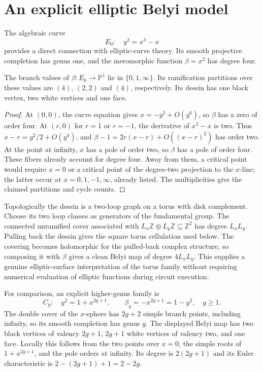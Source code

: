 \section{An explicit elliptic Belyi model}

The algebraic curve
\[
 E_0:\quad y^2=x^3-x
\]
provides a direct connection with elliptic-curve theory.  Its smooth
projective completion has genus one, and the meromorphic function
$\beta=x^2$ has degree four.

\begin{proposition}
The branch values of $\beta:E_0\to\mathbb P^1$ lie in
$\{0,1,\infty\}$.  Its ramification partitions over these values are
$(4)$, $(2,2)$ and $(4)$, respectively.  Its dessin has one black vertex,
two white vertices and one face.
\end{proposition}
\begin{proof}
At $(0,0)$, the curve equation gives $x=-y^2+O(y^6)$, so $\beta$ has
a zero of order four.  At $(r,0)$ for $r=1$ or $r=-1$, the derivative of
$x^3-x$ is two.  Thus $x-r=y^2/2+O(y^4)$, and
$\beta-1=2r(x-r)+O((x-r)^2)$ has order two.  At the point at infinity,
$x$ has a pole of order two, so $\beta$ has a pole of order four.
These fibers already account for degree four.  Away from them, a critical
point would require $x=0$ or a critical point of the degree-two projection
to the $x$-line; the latter occur at $x=0,1,-1,\infty$, already listed.
The multiplicities give the claimed partitions and cycle counts.
\end{proof}

Topologically the dessin is a two-loop graph on a torus with disk
complement.  Choose its two loop classes as generators of the fundamental
group.  The connected unramified cover associated with
$L_x\mathbb Z\oplus L_y\mathbb Z\subseteq\mathbb Z^2$ has degree
$L_xL_y$.  Pulling back the dessin gives the square torus cellulation
used below.  The covering becomes holomorphic for the pulled-back complex
structure, so composing it with $\beta$ gives a clean Belyi map of degree
$4L_xL_y$.  This supplies a genuine elliptic-surface interpretation of
the torus family without requiring numerical evaluation of elliptic
functions during circuit execution.

For comparison, an explicit higher-genus family is
\[
 C_g:\quad y^2=1+x^{2g+1},\qquad \beta_g=-x^{2g+1}=1-y^2,
 \quad g\geq1.
\]
The double cover of the $x$-sphere has $2g+2$ simple branch points,
including infinity, so its smooth completion has genus $g$.  The displayed
Belyi map has two black vertices of valency $2g+1$, $2g+1$ white vertices
of valency two, and one face.  Locally this follows from the two points
over $x=0$, the simple roots of $1+x^{2g+1}$, and the pole orders at
infinity.  Its degree is $2(2g+1)$ and its Euler characteristic is
$2-(2g+1)+1=2-2g$.

